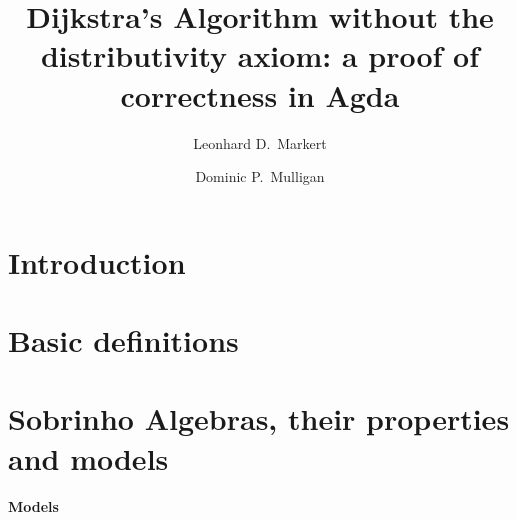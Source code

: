 \documentclass{llncs}
\begin{document}


\title{Dijkstra's Algorithm without the distributivity axiom: a proof of correctness in Agda}
\author{Leonhard D.~Markert \and Dominic P.~Mulligan}

\maketitle

\begin{abstract}

\end{abstract}

\section{Introduction}
\label{sect.introduction}



\section{Basic definitions}
\label{sect.basic.definitions}



\section{Sobrinho Algebras, their properties and models}
\label{sect.path.algebras.their.properties.and.models}



\paragraph{Models}
\label{subsect.models}
\end{document}
